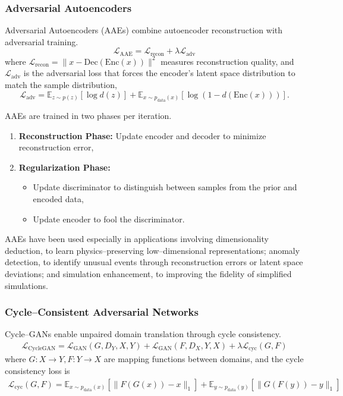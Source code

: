         \subsubsection{Adversarial Autoencoders}
        Adversarial Autoencoders (AAEs) combine autoencoder reconstruction with adversarial training.
        \begin{equation}
            \mathcal{L}_{\text{AAE}} = \mathcal{L}_{\text{recon}} + \lambda \mathcal{L}_{\text{adv}}
        \end{equation}
        where \(\mathcal{L}_{\text{recon}} = \|x - \text{Dec}(\text{Enc}(x))\|^2\) measures reconstruction quality, and \(\mathcal{L}_{\text{adv}}\) is the adversarial loss that forces the encoder's latent space distribution to match the sample distribution,
        \begin{equation}
            \mathcal{L}_{\text{adv}} = \mathbb{E}_{z \sim p(z)}[\log d(z)] + \mathbb{E}_{x \sim p_{\text{data}}(x)}[\log(1 - d(\text{Enc}(x)))].
        \end{equation}

        AAEs are trained in two phases per iteration.
        \begin{enumerate}
            \item \textbf{Reconstruction Phase:} Update encoder and decoder to minimize reconstruction error,
            \item \textbf{Regularization Phase:}
            \begin{itemize}
                \item Update discriminator to distinguish between samples from the prior and encoded data,
                \item Update encoder to fool the discriminator.
            \end{itemize}
        \end{enumerate}
        AAEs have been used especially in applications involving dimensionality deduction, to learn physics--preserving low--dimensional representations;
        anomaly detection, to identify unusual events through reconstruction errors or latent space deviations; and simulation enhancement, to improving the fidelity of simplified simulations.
    \subsubsection{Cycle--Consistent Adversarial Networks}
        Cycle--GANs enable unpaired domain translation through cycle consistency.
        \begin{gather}
            \mathcal{L}_{\text{CycleGAN}} = \mathcal{L}_{\text{GAN}}(G, D_Y, X, Y) + \mathcal{L}_{\text{GAN}}(F, D_X, Y, X) + \lambda \mathcal{L}_{\text{cyc}}(G, F)
        \end{gather}
        where \(G: X \rightarrow Y, F: Y \rightarrow X\) are mapping functions between domains, and the cycle consistency loss is
        \begin{gather}
            \mathcal{L}_{\text{cyc}}(G, F) = \mathbb{E}_{x \sim p_{\text{data}}(x)}[\|F(G(x)) - x\|_1] + \mathbb{E}_{y \sim p_{\text{data}}(y)}[\|G(F(y)) - y\|_1]
        \end{gather}
        

